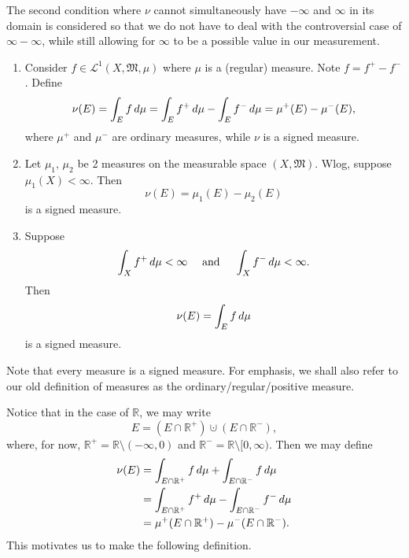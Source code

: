 \documentclass[notoc,notitlepage]{tufte-book}
\begin{document}
\begin{remark}
  The second condition where $\nu$ cannot simultaneously have $-\infty$
  and $\infty$ in its domain is considered so that we do not have
  to deal with the controversial case of $\infty - \infty$,
  while still allowing for $\infty$ to be a possible value
  in our measurement.
\end{remark}

\begin{eg}
  \begin{enumerate}
    \item Consider $f \in \mathcal{L}^1(X, \mathfrak{M}, \mu)$ where
      $\mu$ is a (regular) measure. Note $f = f^+ - f^-$.
      Define
      \begin{equation*}
        \nu(E) = \int_E f \mathop{}\!d{\mu} = \int_E f^+ \mathop{}\!d{\mu} - \int_E f^- \mathop{}\!d{\mu}
             = \mu^+(E) - \mu^-(E),
      \end{equation*}
      where $\mu^+$ and $\mu^-$ are ordinary measures,
      while $\nu$ is a signed measure.

    \item Let $\mu_1,\, \mu_2$ be 2 measures on the measurable space
      $(X, \mathfrak{M})$.
      Wlog, suppose $\mu_1(X) < \infty$.
      Then
      \begin{equation*}
        \nu(E) = \mu_1(E) - \mu_2(E)
      \end{equation*}
      is a signed measure.

    \item Suppose
      \begin{equation*}
        \int_{X} f^+ \mathop{}\!d{\mu} < \infty \quad\text{ and }\quad
        \int_{X} f^- \mathop{}\!d{\mu} < \infty.
      \end{equation*}
      Then
      \begin{equation*}
        \nu(E) = \int_{E} f \mathop{}\!d{\mu}
      \end{equation*}
      is a signed measure.
  \end{enumerate}
\end{eg}

\begin{note}
  Note that every measure is a signed measure.
  For emphasis, we shall also refer to our old definition of measures
  as the ordinary/regular/positive measure.
\end{note}

Notice that in the case of $\mathbb{R}$, we may write
\begin{equation*}
  E = (E \cap \mathbb{R}^+) \cupdot (E \cap \mathbb{R}^-),
\end{equation*}
where, for now, $\mathbb{R}^+ = \mathbb{R} \setminus (-\infty, 0)$
and $\mathbb{R}^- = \mathbb{R} \setminus [0, \infty)$.
Then we may define
\begin{align*}
  \nu(E)
  &= \int_{E \cap \mathbb{R}^+} f \mathop{}\!d{\mu}
    + \int_{E \cap \mathbb{R}^-} f \mathop{}\!d{\mu} \\
  &= \int_{E \cap \mathbb{R}^+} f^+ \mathop{}\!d{\mu}
    - \int_{E \cap \mathbb{R}^-} f^- \mathop{}\!d{\mu} \\
  &= \mu^+(E \cap \mathbb{R}^+) - \mu^-(E \cap \mathbb{R}^-).
\end{align*}
This motivates us to make the following definition.
\end{document}
